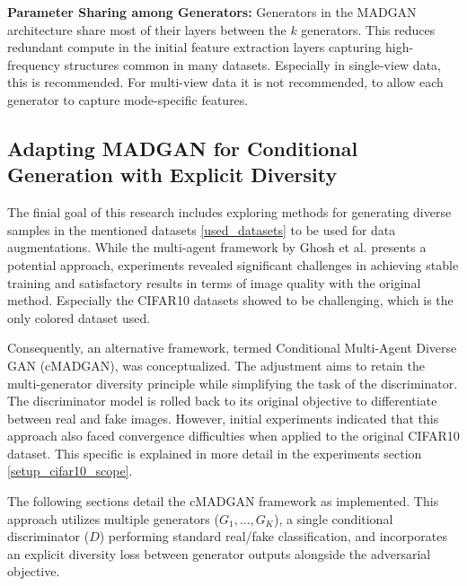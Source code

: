 \noindent\textbf{Parameter Sharing among Generators:} Generators in the MADGAN architecture share most of their layers between the \(k\) generators. This reduces redundant compute in the initial feature extraction layers capturing high-frequency structures common in many datasets. Especially in single-view data, this is recommended. For multi-view data it is not recommended, to allow each generator to capture mode-specific features.

\newcommand{\definegenerator}{\texttt{define\_generator}}
\newcommand{\definediscriminator}{\texttt{define\_discriminator}}
\newcommand{\lambdadiv}{\lambda_{\text{div}}}
\subsection[Adapting MAD-GAN for Conditional Generation with Explicit Diversity - CMADGAN]{Adapting MADGAN for Conditional Generation with Explicit Diversity}
\label{theoretical_cmadgan}

The finial goal of this research includes exploring methods for generating diverse samples in the mentioned datasets \ref{used_datasets} to be used for data augmentations. While the multi-agent framework by Ghosh et al. presents a potential approach, experiments revealed significant challenges in achieving stable training and satisfactory results in terms of image quality with the original method. Especially the CIFAR10 datasets showed to be challenging, which is the only colored dataset used.

Consequently, an alternative framework, termed Conditional Multi-Agent Diverse GAN (cMADGAN), was conceptualized. The adjustment aims to retain the multi-generator diversity principle while simplifying the task of the discriminator. The discriminator model is rolled back to its original objective to differentiate between real and fake images. However, initial experiments indicated that this approach also faced convergence difficulties when applied to the original CIFAR10 dataset. This specific is explained in more detail in the experiments section \ref{setup_cifar10_scope}.

The following sections detail the cMADGAN framework as implemented. This approach utilizes multiple generators (\( G_1, \dots, G_K \)), a single conditional discriminator (\( D \)) performing standard real/fake classification, and incorporates an explicit diversity loss between generator outputs alongside the adversarial objective.

